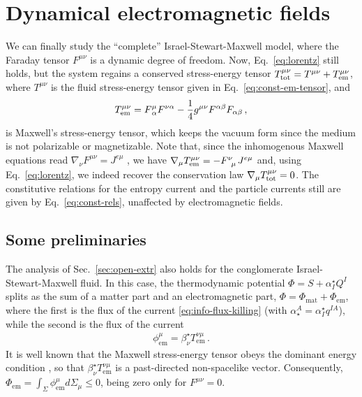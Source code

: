 \documentclass[
a4paper,
amsfonts,
amsmath,
reprint,
showkeys,
nofootinbib,
twoside,
onecolumn,
notitlepage
]{revtex4-1}
\begin{document}
	\section{Dynamical electromagnetic fields}
	\label{sec:dynamic-fields}
	
	We can finally study the ``complete'' Israel-Stewart-Maxwell model, where the Faraday tensor $F^{\mu \nu}$ is a dynamic degree of freedom. 
	Now, Eq.\ \eqref{eq:lorentz} still holds, but the system regains a conserved stress-energy tensor $T^{\mu \nu}_{\text{tot}}=T^{\mu \nu}+T^{\mu\nu}_{\rm em}$, where $T^{\mu \nu}$ is the fluid stress-energy tensor given in Eq.\ \eqref{eq:const-em-tensor}, and
	\begin{eqnarray}
		T^{\mu\nu}_{\rm em} = F^{\mu}_{\,\alpha}F^{\nu\alpha} - \frac{1}{4}g^{\mu\nu}F^{\alpha \beta}F_{\alpha \beta} \, ,
	\end{eqnarray}
	is Maxwell's stress-energy tensor, which keeps the vacuum form since the medium is not polarizable or magnetizable. 
	Note that, since the inhomogenous Maxwell equations read $\nabla_\nu F^{\mu \nu}=J^{e\mu}$ \cite{carroll_2019}, we have $\nabla_\mu T^{\mu\nu}_{\rm em} = -F\indices{^\nu _\mu }J^{e\mu}$ and, using Eq.\ \eqref{eq:lorentz}, we indeed recover the conservation law $\nabla_\mu T^{\mu\nu}_{\rm tot} = 0$.
	The constitutive relations for the entropy current and the particle currents still are given by Eq.\ \eqref{eq:const-rels}, unaffected by electromagnetic fields.
	
	\subsection{Some preliminaries}
	
	The analysis of Sec.\ \ref{sec:open-extr} also holds for the conglomerate Israel-Stewart-Maxwell fluid. 
	In this case, the thermodynamic potential $\Phi=S+\alpha^\star_I Q^I$ splits as the sum of a matter part and an electromagnetic part, $\Phi=\Phi_{\text{mat}}+\Phi_{\text{em}}$, where the first is the flux of the current \eqref{eq:info-flux-killing} (with $\alpha_\star^A=\alpha^\star_I q^{IA}$), while the second is the flux of the current
	\begin{eqnarray}
		\phi^\mu_{\text{em}}=  \beta^\star_\nu T^{\nu \mu}_{\text{em}}\, .
	\end{eqnarray}
	It is well known that the Maxwell stress-energy tensor obeys the dominant energy condition \cite{Nungesser2009}, so that $\beta^\star_\nu T^{\nu \mu}_{\text{em}}$ is a past-directed non-spacelike vector. 
	Consequently, $\Phi_{\text{em}} = \int_\Sigma \phi^\mu_{\text{em}}d{\Sigma}_\mu\leq 0$, being zero only for $F^{\mu \nu}=0$.
	
\end{document}
